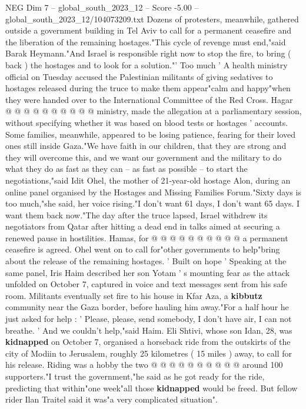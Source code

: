 \begin{textsample}{NEG Dim 7 – global\_south\_2023\_12 – Score -5.00 – global\_south\_2023\_12/104073209.txt}
Dozens of protesters, meanwhile, gathered outside a government building in Tel Aviv to call for a permanent ceasefire and the liberation of the remaining hostages."This cycle of revenge must end,"said Barak Heymann."And Israel is responsible right now to stop the fire, to bring ( back ) the hostages and to look for a solution."' Too much ' A health ministry official on Tuesday accused the Palestinian militants of giving sedatives to hostages released during the truce to make them appear"calm and happy"when they were handed over to the International Committee of the Red Cross.
Hagar @ @ @ @ @ @ @ @ @ @ ministry, made the allegation at a parliamentary session, without specifying whether it was based on blood tests or hostages ' accounts.
Some families, meanwhile, appeared to be losing patience, fearing for their loved ones still inside Gaza."We have faith in our children, that they are strong and they will overcome this, and we want our government and the military to do what they do as fast as they can -- as fast as possible -- to start the negotiations,"said Idit Ohel, the mother of 21-year-old hostage Alon, during an online panel organised by the Hostages and Missing Families Forum."Sixty days is too much,"she said, her voice rising."I don't want 61 days, I don't want 65 days.
I want them back now."The day after the truce lapsed, Israel withdrew its negotiators from Qatar after hitting a dead end in talks aimed at securing a renewed pause in hostilities.
Hamas, for @ @ @ @ @ @ @ @ @ @ a permanent ceasefire is agreed.
Ohel went on to call for"other governments to help"bring about the release of the remaining hostages. ' Built on hope ' Speaking at the same panel, Iris Haim described her son Yotam ' s mounting fear as the attack unfolded on October 7, captured in voice and text messages sent from his safe room.
Militants eventually set fire to his house in Kfar Aza, a \textbf{kibbutz} community near the Gaza border, before hauling him away."For a half hour he just asked for help : ' Please, please, send somebody, I don't have air, I can not breathe. ' And we couldn't help,"said Haim.
Eli Shtivi, whose son Idan, 28, was \textbf{kidnapped} on October 7, organised a horseback ride from the outskirts of the city of Modiin to Jerusalem, roughly 25 kilometres ( 15 miles ) away, to call for his release.
Riding was a hobby the two @ @ @ @ @ @ @ @ @ @ around 100 supporters."I trust the government,"he said as he got ready for the ride, predicting that within"one week"all those \textbf{kidnapped} would be freed.
But fellow rider Ilan Traitel said it was"a very complicated situation".

\end{textsample}
